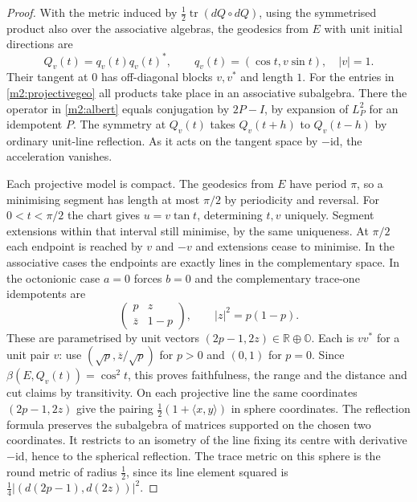 \documentclass[11pt,reqno]{amsart}
\theoremstyle{definition}
\theoremstyle{remark}
\numberwithin{equation}{section}
\newcommand{\R}{\mathbb{R}}
\newcommand{\ip}[2]{\langle #1,#2\rangle}
\begin{document}
\begin{proof}
With the metric induced by $\tfrac12\operatorname{tr}(dQ\circ dQ)$, using the symmetrised product also over the associative algebras, the
geodesics from $E$ with unit initial directions are
\begin{equation}\label{m2:projectivegeo}
 Q_v(t)=q_v(t)q_v(t)^*,\qquad q_v(t)=(\cos t,v\sin t),\quad |v|=1 .
\end{equation}
Their tangent at $0$ has off-diagonal blocks $v,v^*$ and length $1$.  For the entries in \eqref{m2:projectivegeo} all products take place in
an associative subalgebra.  There the operator in \eqref{m2:albert} equals conjugation by $2P-I$, by expansion of $L_P^2$ for an idempotent
$P$.  The symmetry at $Q_v(t)$ takes $Q_v(t+h)$ to $Q_v(t-h)$ by ordinary unit-line reflection.  As it acts on the tangent space by
$-\mathrm{id}$, the acceleration vanishes.

Each projective model is compact.  The geodesics from $E$ have period $\pi$, so a minimising segment has length at most $\pi/2$ by
periodicity and reversal.  For $0<t<\pi/2$ the chart gives $u=v\tan t$, determining $t,v$ uniquely.  Segment extensions within that
interval still minimise, by the same uniqueness.  At $\pi/2$ each endpoint is reached by $v$ and $-v$ and extensions cease to minimise.  In
the associative cases the endpoints are exactly lines in the complementary space.  In the octonionic case $a=0$ forces $b=0$ and the
complementary trace-one idempotents are
\[
 \begin{pmatrix}p&z\\\overline z&1-p\end{pmatrix},\qquad |z|^2=p(1-p).
\]
These are parametrised by unit vectors $(2p-1,2z)\in\R\oplus\mathbb O$.  Each is $vv^*$ for a unit pair $v$: use
$(\sqrt p,\overline z/\sqrt p)$ for $p>0$ and $(0,1)$ for $p=0$.  Since $\beta(E,Q_v(t))=\cos^2t$, this proves faithfulness, the range
and the distance and cut claims by transitivity.  On each projective line the same coordinates $(2p-1,2z)$ give the pairing
$\tfrac12(1+\ip xy)$ in sphere coordinates.  The reflection formula preserves the subalgebra of matrices supported on the chosen two
coordinates.  It restricts to an isometry of the line fixing its centre with derivative $-\mathrm{id}$, hence to the spherical reflection.
The trace metric on this sphere is the round metric of radius $\tfrac12$, since its line element squared is
$\tfrac14|(d(2p-1),d(2z))|^2$.


\end{proof}
\end{document}
